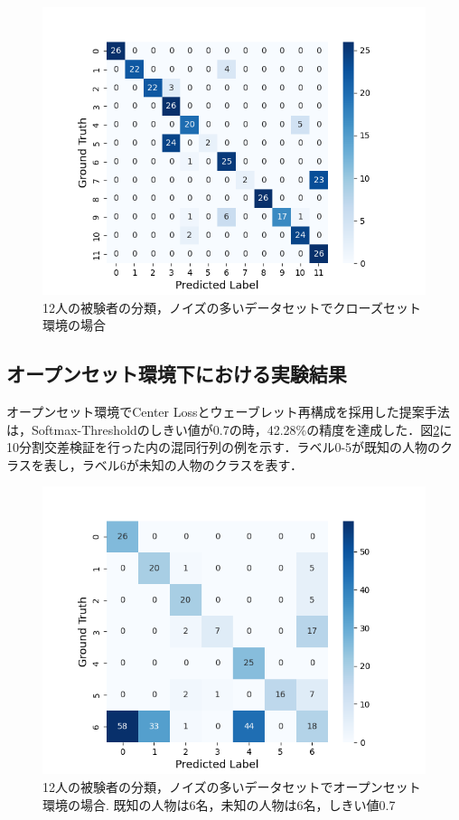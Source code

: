 \begin{figure}[H]
\begin{center}
\includegraphics[width=\linewidth]{./fig/noisy_dataset/cross_val_Fold0_close.png}
\end{center}
\caption{12人の被験者の分類，ノイズの多いデータセットでクローズセット環境の場合}
\label{fig:12close-conf}
\end{figure}

\subsection{オープンセット環境下における実験結果}
オープンセット環境でCenter Lossとウェーブレット再構成を採用した提案手法は，Softmax-Thresholdのしきい値が0.7の時，42.28\%の精度を達成した．図\ref{fig:12open-conf}に10分割交差検証を行った内の混同行列の例を示す．ラベル0-5が既知の人物のクラスを表し，ラベル6が未知の人物のクラスを表す．

\begin{figure}[H]
  \begin{center}
  \includegraphics[width=\linewidth]{./fig/noisy_dataset/cross_val_Fold0_threshold0.7_6_6.png}
  \end{center}
\caption{12人の被験者の分類，ノイズの多いデータセットでオープンセット環境の場合.
既知の人物は6名，未知の人物は6名，しきい値0.7}
\label{fig:12open-conf}
\end{figure}

